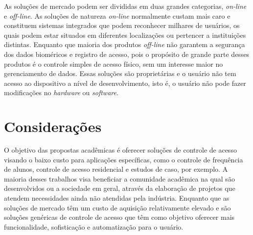  
 As soluções de mercado podem ser divididas em duas grandes categorias, \textit{on-line} e \textit{off-line}. As soluções de natureza \textit{on-line} normalmente custam mais caro e constituem sistemas integrados que podem reconhecer milhares de usuários, os quais podem estar situados em diferentes localizações ou pertencer a instituições distintas. Enquanto que maioria dos produtos \textit{off-line} não garantem a segurança dos dados bioméricos e registro de acesso, pois o propósito de grande parte desses produtos é o controle simples de acesso físico, sem um interesse maior no gerenciamento de dados. Essas soluções são proprietárias e o usuário não tem acesso ao dispositivo a nível de desenvolvimento, isto é, o usuário não pode fazer modificações no \textit{hardware} ou \textit{software}.


 \section{Considerações}

 O objetivo das propostas acadêmicas é oferecer soluções de controle de acesso visando o baixo custo para aplicações específicas, como o controle de frequência de alunos, controle de acesso residencial e estudos de caso, por exemplo. A maioria desses trabalhos visa beneficiar a comunidade acadêmica na qual são desenvolvidos ou a sociedade em geral, através da elaboração de projetos que atendem necessidades ainda não atendidas pela indústria. Enquanto que as soluções de mercado têm um custo de aquisição relativamente elevado e são soluções genéricas de controle de acesso que têm como objetivo oferecer mais funcionalidade, sofisticação e automatização para o usuário.
 
 
 
 